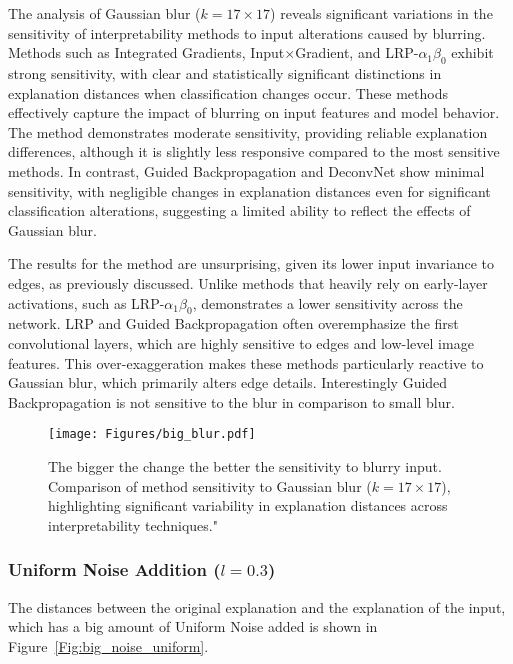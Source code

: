 The analysis of Gaussian blur ($k = 17 \times 17$) reveals significant variations in the sensitivity of interpretability methods to input alterations caused by blurring. Methods such as Integrated Gradients, Input$\times$Gradient, and LRP-$\alpha_1\beta_0$ exhibit strong sensitivity, with clear and statistically significant distinctions in explanation distances when classification changes occur. These methods effectively capture the impact of blurring on input features and model behavior. The \CTC\/ method demonstrates moderate sensitivity, providing reliable explanation differences, although it is slightly less responsive compared to the most sensitive methods. In contrast, Guided Backpropagation and DeconvNet show minimal sensitivity, with negligible changes in explanation distances even for significant classification alterations, suggesting a limited ability to reflect the effects of Gaussian blur. 

The results for the \CTC\/ method are unsurprising, given its lower input invariance to edges, as previously discussed. Unlike methods that heavily rely on early-layer activations, such as LRP-$\alpha_1\beta_0$, \CTC\/ demonstrates a lower sensitivity across the network. LRP and Guided Backpropagation often overemphasize the first convolutional layers, which are highly sensitive to edges and low-level image features. This over-exaggeration makes these methods particularly reactive to Gaussian blur, which primarily alters edge details. Interestingly Guided Backpropagation is not sensitive to the blur in comparison to small blur.
\begin{figure}[ht!]
	\begin{center}
		\texttt{[image: Figures/big\_blur.pdf]}
	\end{center}
	\caption{The bigger the change the better the sensitivity to blurry input. Comparison of method sensitivity to Gaussian blur ($k = 17 \times 17$), highlighting significant variability in explanation distances across interpretability techniques."}
	\label{Fig:big_blur}
\end{figure} 

\subsubsection{Uniform Noise Addition ($l = 0.3$)}
The distances between the original explanation and the explanation of the input, which has a big amount of Uniform Noise added is shown in Figure~\ref{Fig:big_noise_uniform}. 

